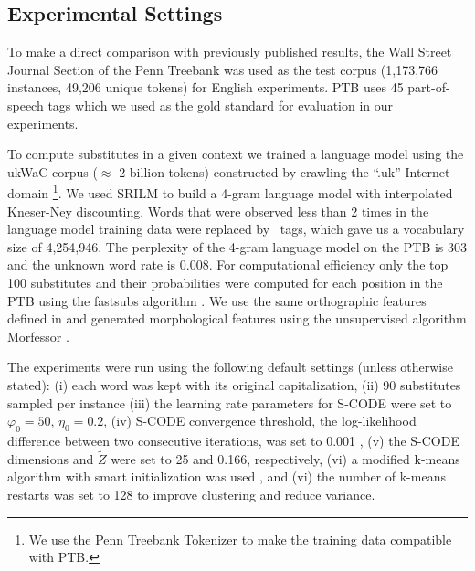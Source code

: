 \subsection{Experimental Settings}
\label{sec:expset}

To make a direct comparison with previously published results,
the Wall Street Journal Section of the Penn Treebank was used as the
test corpus (1,173,766 instances, 49,206 unique tokens) for English
experiments.
PTB uses 45 part-of-speech tags which we used as the gold standard for
evaluation in our experiments.

To compute substitutes in a given context we trained a language model
using the ukWaC corpus ($\approx$ 2 billion tokens) constructed by
crawling the ``.uk'' Internet
domain \cite{ferraresi2008introducing}\footnote{We use the Penn
  Treebank Tokenizer to make the training data compatible with PTB.}.
We used SRILM \cite{Stolcke2002} to build a 4-gram language model with
interpolated Kneser-Ney discounting.
Words that were observed less than 2 times in the language model
training data were replaced by \unk\ tags, which gave us a
vocabulary size of 4,254,946. 
The perplexity of the 4-gram language model on the PTB is 303 and the
unknown word rate is 0.008.  For computational efficiency only the top
100 substitutes and their probabilities were computed for each
position in the PTB using the {\sc fastsubs} algorithm \cite{yuret2012fastsub}.  
We use the same orthographic features defined in
\cite{yatbaz-sert-yuret:2012:EMNLP-CoNLL} and generated morphological
features using the unsupervised algorithm Morfessor \cite{creutz05}.

The experiments were run using the following default settings (unless otherwise
stated): (i) each word was kept with its original capitalization, (ii) 90
substitutes sampled per instance (iii) the learning rate parameters for S-CODE
were set to $\varphi_0=50$, $\eta_0=0.2$, (iv) S-CODE convergence threshold,
the log-likelihood difference between two consecutive iterations, was set to
0.001 , (v) the S-CODE dimensions and $\tilde{Z}$ were set to 25 and 0.166,
respectively, (vi) a modified k-means algorithm with smart initialization was
used \cite{arthur2007k}, and (vi) the number of k-means restarts was set to
128 to improve clustering and reduce variance.

